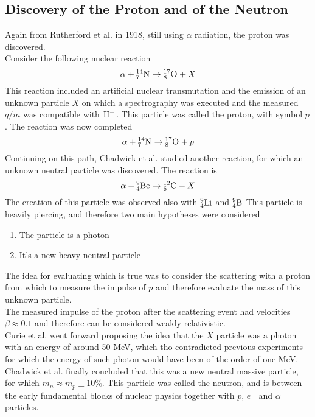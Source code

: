 \documentclass[../qm.tex]{subfiles}
\begin{document}
\subsection{Discovery of the Proton and of the Neutron}
Again from Rutherford et al. in 1918, still using $\alpha$ radiation, the proton was discovered.\\
Consider the following nuclear reaction
\begin{equation*}
	\alpha+\nuc{N}{14}{7}\to\nuc{O}{17}{8}+X
\end{equation*}
This reaction included an artificial nuclear transmutation and the emission of an unknown particle $X$ on which a spectrography was executed and the measured $q/m$ was compatible with $\nuc{H^+}{}{}$. This particle was called the proton, with symbol $p$. The reaction was now completed
\begin{equation*}
	\alpha+\nuc{N}{14}{7}\to\nuc{O}{17}{8}+p
\end{equation*}
Continuing on this path, Chadwick et al. studied another reaction, for which an unknown neutral particle was discovered. The reaction is
\begin{equation*}
	\alpha+\nuc{Be}{9}{4}\to\nuc{C}{12}{6}+X
\end{equation*}
The creation of this particle was observed also with $\nuc{Li}{9}{4}$ and $\nuc{B}{9}{4}$
This particle is heavily piercing, and therefore two main hypotheses were considered
\begin{enumerate}
\item The particle is a photon
\item It's a new heavy neutral particle
\end{enumerate}
The idea for evaluating which is true was to consider the scattering with a proton from which to measure the impulse of $p$ and therefore evaluate the mass of this unknown particle.\\
The measured impulse of the proton after the scattering event had velocities $\beta\approx0.1$ and therefore can be considered weakly relativistic.\\
Curie et al. went forward proposing the idea that the $X$ particle was a photon with an energy of around 50 MeV, which tho contradicted previous experiments for which the energy of such photon would have been of the order of one MeV.\\
Chadwick et al. finally concluded that this was a new neutral massive particle, for which $m_n\approx m_p\pm10\%$. This particle was called the neutron, and is between the early fundamental blocks of nuclear physics together with $p$, $e^-$ and $\alpha$ particles.
\end{document}
